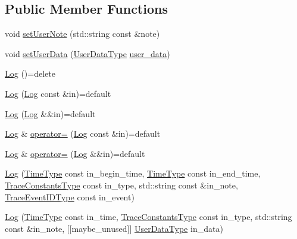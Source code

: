 \subsection*{Public Member Functions}
\begin{DoxyCompactItemize}
\item 
void \hyperlink{structvt_1_1trace_1_1_log_a823483c0dc5480368e03e89774a0ae9d}{set\+User\+Note} (std\+::string const \&note)
\item 
void \hyperlink{structvt_1_1trace_1_1_log_ae9ac348d526adb9f6c39d853cab5c3c3}{set\+User\+Data} (\hyperlink{structvt_1_1trace_1_1_log_af392c3825bf45d286a0f77bddf7a96cf}{User\+Data\+Type} \hyperlink{structvt_1_1trace_1_1_log_a7b251bc7dcebcbbafa29cc2ca6ea4c12}{user\+\_\+data})
\item 
\hyperlink{structvt_1_1trace_1_1_log_a60d449b9ab317e6b6bb93b4f0441fd2f}{Log} ()=delete
\item 
\hyperlink{structvt_1_1trace_1_1_log_a445abf4a0c8f48b1db961edf759566aa}{Log} (\hyperlink{structvt_1_1trace_1_1_log}{Log} const \&in)=default
\item 
\hyperlink{structvt_1_1trace_1_1_log_a7474e1eb2e7f2bfb879bb9e94773f82e}{Log} (\hyperlink{structvt_1_1trace_1_1_log}{Log} \&\&in)=default
\item 
\hyperlink{structvt_1_1trace_1_1_log}{Log} \& \hyperlink{structvt_1_1trace_1_1_log_aee97393891b92cb473bc4cee38542e52}{operator=} (\hyperlink{structvt_1_1trace_1_1_log}{Log} const \&in)=default
\item 
\hyperlink{structvt_1_1trace_1_1_log}{Log} \& \hyperlink{structvt_1_1trace_1_1_log_a49bd966fc97414a197f80a2cfbe55bb3}{operator=} (\hyperlink{structvt_1_1trace_1_1_log}{Log} \&\&in)=default
\item 
\hyperlink{structvt_1_1trace_1_1_log_a65544873c23cae6e8edf4b7b57785e48}{Log} (\hyperlink{namespacevt_a2b9f28078dc309ad0706b69ded743e69}{Time\+Type} const in\+\_\+begin\+\_\+time, \hyperlink{namespacevt_a2b9f28078dc309ad0706b69ded743e69}{Time\+Type} const in\+\_\+end\+\_\+time, \hyperlink{namespacevt_1_1trace_acf454dfbd581b0ebae895f90b5927a1d}{Trace\+Constants\+Type} const in\+\_\+type, std\+::string const \&in\+\_\+note, \hyperlink{namespacevt_1_1trace_a64a7185f3e102df8d8258f263ccd1582}{Trace\+Event\+I\+D\+Type} const in\+\_\+event)
\item 
\hyperlink{structvt_1_1trace_1_1_log_a03d5c5f06a5069379636e04202648b08}{Log} (\hyperlink{namespacevt_a2b9f28078dc309ad0706b69ded743e69}{Time\+Type} const in\+\_\+time, \hyperlink{namespacevt_1_1trace_acf454dfbd581b0ebae895f90b5927a1d}{Trace\+Constants\+Type} const in\+\_\+type, std\+::string const \&in\+\_\+note, \mbox{[}\mbox{[}maybe\+\_\+unused\mbox{]}\mbox{]} \hyperlink{structvt_1_1trace_1_1_log_af392c3825bf45d286a0f77bddf7a96cf}{User\+Data\+Type} in\+\_\+data)

\end{DoxyCompactItemize}
